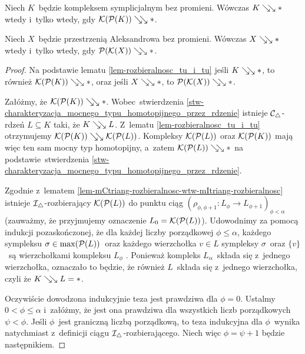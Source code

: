 \begin{stw}\label{stw-rozbieralany_kompleks_wtw_gdy_podzial_barycentryczny}
Niech $K$~będzie kompleksem symplicjalnym bez promieni. Wówczas $K\searrow\!\!\searrow *$ wtedy i~tylko wtedy, gdy $\mathcal{K}(\mathcal{P}(K))\searrow\!\!\searrow *$.

Niech $X$~będzie przestrzenią Aleksandrowa bez promieni. Wówczas $X\searrow\!\!\searrow *$ wtedy i~tylko wtedy, gdy $\mathcal{P}(\mathcal{K}(X))\searrow\!\!\searrow *$.
\end{stw}
\begin{proof}
Na podstawie lematu \ref{lem-rozbieralnosc_tu_i_tu} jeśli $K\searrow\!\!\searrow *$, to również $\mathcal{K}(\mathcal{P}(K))\searrow\!\!\searrow *$, oraz jeśli $X\searrow\!\!\searrow *$, to $\mathcal{P}(\mathcal{K}(X))\searrow\!\!\searrow *$.

Załóżmy, że $\mathcal{K}(\mathcal{P}(K))\searrow\!\!\searrow *$. Wobec~stwierdzenia \ref{stw-charakteryzacja_mocnego_typu_homotopijnego_przez_rdzenie} istnieje $\mathcal{C}_\triangle$-rdzeń $L\subseteq K$ taki, że $K\searrow\!\!\searrow L$. Z~lematu \ref{lem-rozbieralnosc_tu_i_tu} otrzymujemy $\mathcal{K}(\mathcal{P}(K))\searrow\!\!\searrow \mathcal{K}(\mathcal{P}(L))$. Kompleksy $\mathcal{K}(\mathcal{P}(L))$ oraz $\mathcal{K}(\mathcal{P}(K))$ mają więc ten sam mocny typ homotopijny, a~zatem $\mathcal{K}(\mathcal{P}(L))\searrow\!\!\searrow *$ na podstawie~stwierdzenia \ref{stw-charakteryzacja_mocnego_typu_homotopijnego_przez_rdzenie}.

Zgodnie z~lematem \ref{lem-mCtriang-rozbieralnosc-wtw-mItriang-rozbieralnosc} istnieje $\mathcal{I}_\triangle$-rozbierający $\mathcal{K}(\mathcal{P}(L))$ do punktu ciąg $\left(\rho_{\phi,\phi+1}\colon L_\phi\to L_{\phi+1}\right)_{\phi<\alpha}$ (zauważmy, że przyjmujemy oznaczenie $L_0=\mathcal{K}(\mathcal{P}(L))$).  Udowodnimy za pomocą indukcji pozaskończonej, że dla każdej liczby porządkowej $\phi\leq\alpha$, każdego sympleksu $\sigma\in\max(\mathcal{P}(L))$~oraz każdego wierzchołka $v\in L$ sympleksy $\sigma$~oraz $\{v\}$~są wierzchołkami kompleksu $L_{\phi}$ . Ponieważ kompleks $L_\alpha$~składa się z~jednego wierzchołka, oznaczało to będzie, że również $L$~składa się z~jednego wierzchołka, czyli że $K\searrow\!\!\searrow L=*$.

Oczywiście dowodzona indukcyjnie teza jest prawdziwa dla $\phi=0$. Ustalmy $0<\phi\leq \alpha$ i~załóżmy, że jest ona prawdziwa dla wszystkich liczb porządkowych $\psi<\phi$. Jeśli $\phi$~jest graniczną liczbą porządkową, to teza indukcyjna dla $\phi$~wynika natychmiast z~definicji ciągu $\mathcal{I}_\triangle$-rozbierającego. Niech więc $\phi=\psi+1$ będzie następnikiem.


\end{proof}
